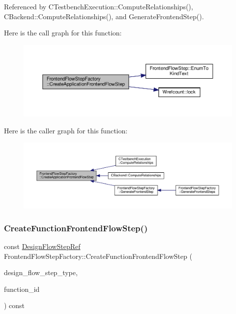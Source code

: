 Referenced by C\+Testbench\+Execution\+::\+Compute\+Relationships(), C\+Backend\+::\+Compute\+Relationships(), and Generate\+Frontend\+Step().

Here is the call graph for this function\+:
\nopagebreak
\begin{figure}[H]
\begin{center}
\leavevmode
\includegraphics[width=350pt]{db/dd6/classFrontendFlowStepFactory_acb4687f1adae9d742883ba490af45993_cgraph}
\end{center}
\end{figure}
Here is the caller graph for this function\+:
\nopagebreak
\begin{figure}[H]
\begin{center}
\leavevmode
\includegraphics[width=350pt]{db/dd6/classFrontendFlowStepFactory_acb4687f1adae9d742883ba490af45993_icgraph}
\end{center}
\end{figure}
\mbox{\label{classFrontendFlowStepFactory_a16fcc4098999af461632f4af3404e6fc}} 
\subsubsection{\texorpdfstring{Create\+Function\+Frontend\+Flow\+Step()}{CreateFunctionFrontendFlowStep()}}
{\footnotesize\ttfamily const \hyperlink{design__flow__step_8hpp_a9dd6b4474ddf52d41a78b1aaa12ae6c8}{Design\+Flow\+Step\+Ref} Frontend\+Flow\+Step\+Factory\+::\+Create\+Function\+Frontend\+Flow\+Step (\begin{DoxyParamCaption}\item[{const \hyperlink{frontend__flow__step_8hpp_afeb3716c693d2b2e4ed3e6d04c3b63bb}{Frontend\+Flow\+Step\+Type}}]{design\+\_\+flow\+\_\+step\+\_\+type,  }\item[{const unsigned int}]{function\+\_\+id }\end{DoxyParamCaption}) const}



